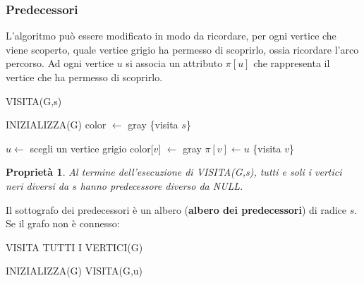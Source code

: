 \documentclass[11pt]{article}
\newtheorem*{proprietà}{Proprietà}
\begin{document}
\subsubsection{Predecessori}
L'algoritmo può essere modificato in modo da ricordare, per ogni vertice che viene scoperto, quale vertice grigio ha permesso 
di scoprirlo, ossia ricordare l'arco percorso. Ad ogni vertice $u$ si associa un attributo $\pi[u]$ che rappresenta il 
vertice che ha permesso di scoprirlo.
\begin{algorithm}[H]
    \caption{VISITA(G,s)}
    \begin{algorithmic}
        \State INIZIALIZZA(G)
        \State color $\gets$ gray
        \State \{visita $s$\}
    \end{algorithmic}
\end{algorithm}
\begin{algorithm}[H]
    \begin{algorithmic}
        \State $u \gets$ scegli un vertice grigio
                \State color[$v$] $\gets$ gray
                \State $\pi[v] \gets u$
                \State \{visita $v$\}
            \EndIf
        \EndWhile
    \end{algorithmic}
\end{algorithm}
\begin{proprietà}
    Al termine dell'esecuzione di VISITA(G,s), tutti e soli i vertici neri diversi da $s$ hanno predecessore diverso da 
    NULL.
\end{proprietà}
Il sottografo dei predecessori è un albero (\textbf{albero dei predecessori}) di radice $s$.\\
Se il grafo non è connesso:
\begin{algorithm}[H]
    \caption{VISITA TUTTI I VERTICI(G)}
    \begin{algorithmic}
        \State INIZIALIZZA(G)
            \State VISITA(G,u)
            \EndIf
        \EndFor
    \end{algorithmic}
\end{algorithm}
\end{document}
